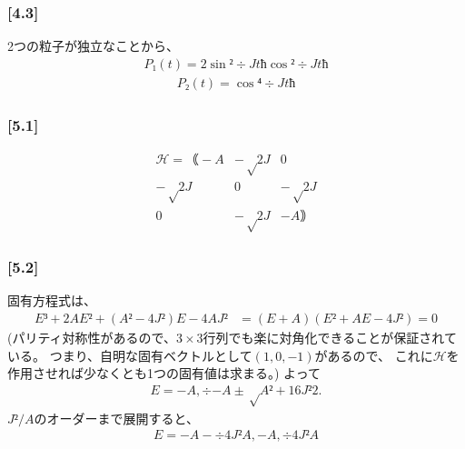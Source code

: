 \documentclass[\main/main.tex]{subfiles}
\begin{document}
\subsubsection*{
  [4.3]
}
2つの粒子が独立なことから、
\begin{align}
  P₁(t)
  = 2\sin²÷{Jt}{ħ}\cos²÷{Jt}{ħ} %
\end{align}
\begin{align}
  P₂(t) = \cos⁴÷{Jt}{ħ} %
\end{align}
\subsubsection*{
  [5.1]
}
\begin{align}
  ℋ = ｟
    -A&-√2J&0\\
    -√2J&0&-√2J\\
    0&-√2J&-A
  ｠
\end{align}
\subsubsection*{
  [5.2]
}
固有方程式は、
\begin{align}
  E³ + 2AE² +(A²-4J²)E - 4AJ²
  &
  = (E+A)(E²+AE-4J²) = 0
\end{align}
(パリティ対称性があるので、$3×3$行列でも楽に対角化できることが保証されている。
つまり、自明な固有ベクトルとして$(1,0,-1)$があるので、
これに$ℋ$を作用させれば少なくとも1つの固有値は求まる。)
よって
\begin{align}
  E = -A,÷{-A±√{A²+16J²}}{2}.
\end{align}
$J²/A$のオーダーまで展開すると、
\begin{align}
  E = -A-÷{4J²}{A},-A,÷{4J²}{A}
\end{align}
\end{document}
